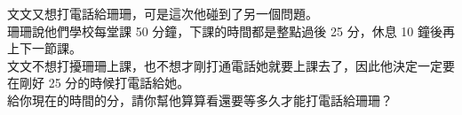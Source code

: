 文文又想打電話給珊珊，可是這次他碰到了另一個問題。\\
珊珊說他們學校每堂課 50 分鐘，下課的時間都是整點過後 25 分，休息 10 鐘後再上下一節課。\\
文文不想打擾珊珊上課，也不想才剛打通電話她就要上課去了，因此他決定一定要在剛好 25 分的時候打電話給她。\\
給你現在的時間的分，請你幫他算算看還要等多久才能打電話給珊珊？